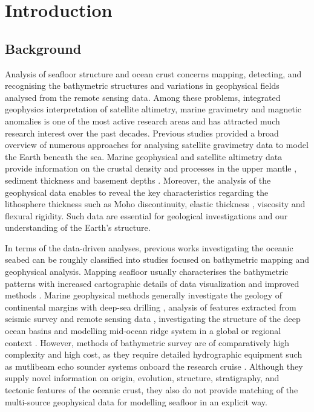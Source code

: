 \documentclass[land,article,submit,pdftex,moreauthors]{Definitions/mdpi}
\begin{document}
\section{Introduction}

\subsection{Background}
Analysis of seafloor structure and ocean crust concerns mapping, detecting, and recognising the bathymetric structures and variations in geophysical fields analysed from the remote sensing data. Among these problems, integrated geophysics interpretation of satellite altimetry,  marine gravimetry and magnetic anomalies is one of the most active research areas and has attracted much research interest over the past decades. Previous studies \cite{ESHAGH2021313} provided a broad overview of numerous approaches for analysing satellite gravimetry data to model the Earth beneath the sea. Marine geophysical and satellite altimetry data provide information on the crustal density and processes in the upper mantle \cite{KAPAWAR2021106692,PENG2022110823,ZHANG202368}, sediment thickness and basement depths \cite{Lemenkova202005}. Moreover, the analysis of the geophysical data enables to reveal the key characteristics regarding the lithosphere thickness such as Moho discontinuity, elastic thickness \cite{TESAURO201378}, viscosity and flexural rigidity. Such data are essential for geological investigations and our understanding of the Earth's structure.

In terms of the data-driven analyses, previous works investigating the oceanic seabed can be roughly classified into studies focused on bathymetric mapping and geophysical analysis. Mapping seafloor usually characterises the bathymetric patterns with increased cartographic details of data visualization and improved methods \cite{Battista,Lemenkova202105,Lemenkova202012}. Marine geophysical methods generally investigate the geology of continental margins with deep-sea drilling \cite{Schlich1992TheGA,Veevers1991a}, analysis of features extracted from seismic survey and remote sensing data \cite{NEGI2022229330}, investigating the structure of the deep ocean basins \cite{BENARD2010633,RAMANA2001241,DAVIS201616} and modelling mid-ocean ridge system in a global or regional context \cite{FREY200073,Sreejith,Lemenkova202112}. However, methods of bathymetric survey are of comparatively high complexity and high cost, as they require detailed hydrographic equipment such as mutlibeam echo sounder systems onboard the research cruise \cite{Falvey}. Although they supply novel information on origin, evolution, structure, stratigraphy, and tectonic features of the oceanic crust, they also do not provide matching of the multi-source geophysical data for modelling seafloor in an explicit way. 
\end{document}

